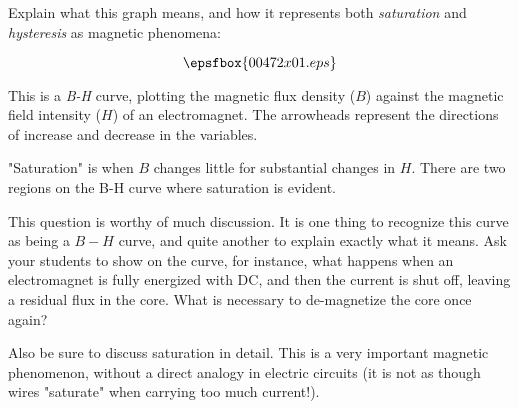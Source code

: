 

Explain what this graph means, and how it represents both {\it saturation} and {\it hysteresis} as magnetic phenomena:

$$\epsfbox{00472x01.eps}$$







This is a {\it B-H} curve, plotting the magnetic flux density ($B$) against the magnetic field intensity ($H$) of an electromagnet.  The arrowheads represent the directions of increase and decrease in the variables.

"Saturation" is when $B$ changes little for substantial changes in $H$.  There are two regions on the B-H curve where saturation is evident.







This question is worthy of much discussion.  It is one thing to recognize this curve as being a $B-H$ curve, and quite another to explain exactly what it means.  Ask your students to show on the curve, for instance, what happens when an electromagnet is fully energized with DC, and then the current is shut off, leaving a residual flux in the core.  What is necessary to de-magnetize the core once again?

Also be sure to discuss saturation in detail.  This is a very important magnetic phenomenon, without a direct analogy in electric circuits (it is not as though wires "saturate" when carrying too much current!).




